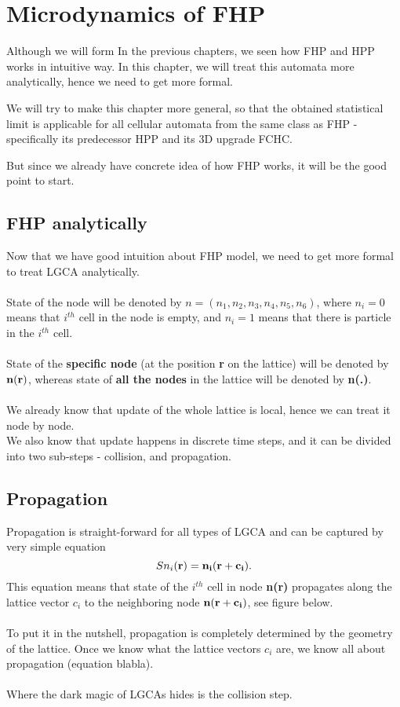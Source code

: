 \chapter{Microdynamics of FHP}

Although we will form 
In the previous chapters, we seen how FHP and HPP works in intuitive way. 
In this chapter, we will treat this automata more analytically, hence we need to get more formal.

We will try to make this chapter more general, so that the obtained statistical limit is applicable for all cellular automata from the same class as FHP - specifically its predecessor HPP and its 3D upgrade FCHC.

\bigskip

But since we already have concrete idea of how FHP works, it will be the good point to start.

\section{FHP analytically}

Now that we have good intuition about FHP model, we need to get more formal to treat LGCA analytically.\\
\\
State of the node will be denoted by $n = (n_1,n_2,n_3,n_4,n_5,n_6)$, where $n_i = 0$ means that $i^{th}$ cell in the node is empty, and $n_i = 1$ means that there is particle in the $i^{th}$ cell.\\
\\
State of the \textbf{specific node} (at the position \textbf{r} on the lattice) will be denoted by $\bf{n(r)}$, whereas state of \textbf{all the nodes} in the lattice will be denoted by \textbf{n(.)}.\\
\\
We already know that update of the whole lattice is local, hence we can treat it node by node.\\
We also know that update happens in discrete time steps, and it can be divided into two sub-steps - collision, and propagation.

\section{Propagation}
Propagation is straight-forward for all types of LGCA and can be captured by very simple equation
\begin{equation}
S n_i(\bf{r}) = n_i(\bf{r + c_i}). 
\end{equation}
This equation means that state of the $i^{th}$ cell in node \textbf{n(r)} propagates along the lattice vector $c_i$ to the neighboring node $\bf{n(r + c_i)}$, see figure below.\\
\\
To put it in the nutshell, propagation is completely determined by the geometry of the lattice. Once we know what the lattice vectors $c_i$ are, we know all about propagation (equation blabla).\\
\\
Where the dark magic of LGCAs hides is the collision step.\\

